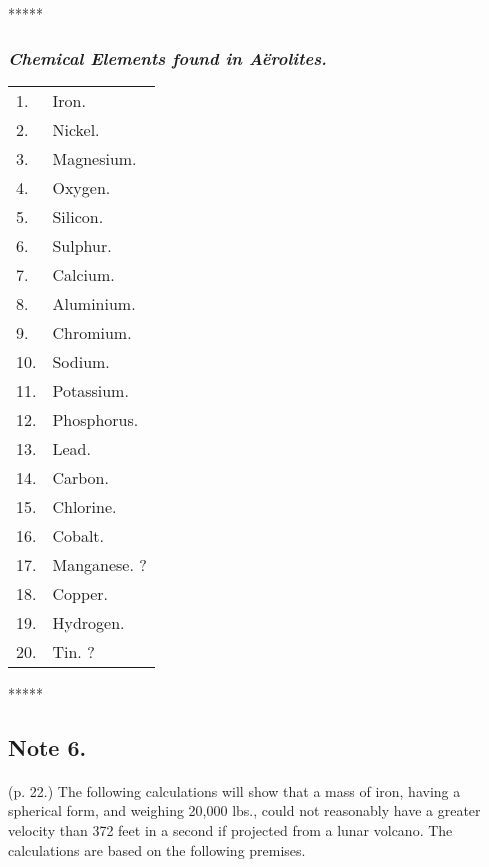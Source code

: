 \documentclass[a4paper, 12pt, oneside]{article}
\begin{document}
\centerline{*\hspace{15mm}*\hspace{15mm}*\hspace{15mm}*\hspace{15mm}*}
\bigskip

\subsubsection{\emph{Chemical Elements found in Aërolites.}}
\begin{table}[H]
    \centering
    \footnotesize
    \begin{tabular}{l l}
        1. & Iron. \\
        2. & Nickel. \\
        3. & Magnesium. \\
        4. & Oxygen. \\
        5. & Silicon. \\
        6. & Sulphur. \\
        7. & Calcium. \\
        8. & Aluminium. \\
        9. & Chromium. \\
        10. & Sodium. \\
        11. & Potassium. \\
        12. & Phosphorus. \\
        13. & Lead. \\
        14. & Carbon. \\
        15. & Chlorine. \\
        16. & Cobalt. \\
        17. & Manganese. ? \\
        18. & Copper. \\
        19. & Hydrogen. \\
        20. & Tin. ? \\
    \end{tabular}
\end{table}

\centerline{*\hspace{15mm}*\hspace{15mm}*\hspace{15mm}*\hspace{15mm}*}
\bigskip

\subsection{Note 6.}
\paragraph{}
(p. 22.) The following calculations will show that a mass of iron, having a spherical form, and weighing 20,000 lbs., could not reasonably have a greater velocity than 372 feet in a second if projected from a lunar volcano. The calculations are based on the following premises.
\end{document}
